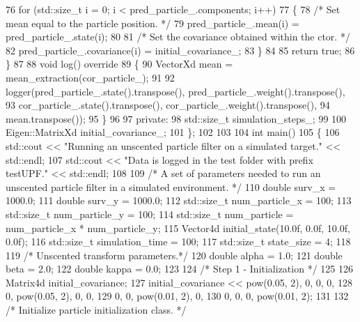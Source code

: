 \begin{DoxyCodeInclude}
76         \textcolor{keywordflow}{for} (std::size\_t i = 0; i < pred\_particle\_.components; i++)
77         \{
78             \textcolor{comment}{/* Set mean equal to the particle position. */}
79             pred\_particle\_.mean(i) = pred\_particle\_.state(i);
80 
81             \textcolor{comment}{/* Set the covariance obtained within the ctor. */}
82             pred\_particle\_.covariance(i) = initial\_covariance\_;
83         \}
84 
85         \textcolor{keywordflow}{return} \textcolor{keyword}{true};
86     \}
87 
88     \textcolor{keywordtype}{void} log()\textcolor{keyword}{ override}
89 \textcolor{keyword}{    }\{
90         VectorXd mean = mean\_extraction(cor\_particle\_);
91 
92         logger(pred\_particle\_.state().transpose(), pred\_particle\_.weight().transpose(),
93                cor\_particle\_.state().transpose(), cor\_particle\_.weight().transpose(),
94                mean.transpose());
95     \}
96 
97 \textcolor{keyword}{private}:
98     std::size\_t simulation\_steps\_;
99 
100     Eigen::MatrixXd initial\_covariance\_;
101 \};
102 
103 
104 \textcolor{keywordtype}{int} main()
105 \{
106     std::cout << \textcolor{stringliteral}{"Running an unscented particle filter on a simulated target."} << std::endl;
107     std::cout << \textcolor{stringliteral}{"Data is logged in the test folder with prefix testUPF."} << std::endl;
108 
109     \textcolor{comment}{/* A set of parameters needed to run an unscented particle filter in a simulated environment. */}
110     \textcolor{keywordtype}{double} surv\_x = 1000.0;
111     \textcolor{keywordtype}{double} surv\_y = 1000.0;
112     std::size\_t num\_particle\_x = 100;
113     std::size\_t num\_particle\_y = 100;
114     std::size\_t num\_particle = num\_particle\_x * num\_particle\_y;
115     Vector4d initial\_state(10.0f, 0.0f, 10.0f, 0.0f);
116     std::size\_t simulation\_time = 100;
117     std::size\_t state\_size = 4;
118 
119     \textcolor{comment}{/* Unscented transform parameters.*/}
120     \textcolor{keywordtype}{double} alpha = 1.0;
121     \textcolor{keywordtype}{double} beta = 2.0;
122     \textcolor{keywordtype}{double} kappa = 0.0;
123 
124     \textcolor{comment}{/* Step 1 - Initialization */}
125 
126     Matrix4d initial\_covariance;
127     initial\_covariance << pow(0.05, 2), 0,            0,            0,
128                           0,            pow(0.05, 2), 0,            0,
129                           0,            0,            pow(0.01, 2), 0,
130                           0,            0,            0,            pow(0.01, 2);
131 
132     \textcolor{comment}{/* Initialize particle initialization class. */}

\end{DoxyCodeInclude}
